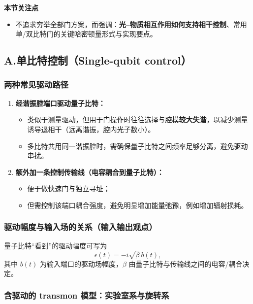 \documentclass[12pt,a4paper,oneside]{ctexbook}
\begin{document}
\noindent\textbf{本节关注点}

\begin{itemize}
  \item 不追求穷举全部门方案，而强调：\textbf{光--物质相互作用如何支持相干控制}、常用单/双比特门的关键哈密顿量形式与实现要点。
\end{itemize}

\subsection{A.\quad 单比特控制（Single-qubit control）}

\subsubsection{两种常见驱动路径}

\begin{enumerate}
  \item \textbf{经谐振腔端口驱动量子比特：}
  \begin{itemize}
    \item 类似于测量驱动，但用于门操作时往往选择与腔模\textbf{较大失谐}，以减少测量诱导退相干（远离谐振，腔内光子数小）。
    \item 多比特共用同一谐振腔时，需确保量子比特之间频率足够分离，避免驱动串扰。
  \end{itemize}

  \item \textbf{额外加一条控制传输线（电容耦合到量子比特）：}
  \begin{itemize}
    \item 便于做快速门与独立寻址；
    \item 但需控制该端口耦合强度，避免明显增加能量弛豫，例如增加辐射损耗。
  \end{itemize}
\end{enumerate}

\subsubsection{驱动幅度与输入场的关系（输入输出观点）}

量子比特“看到”的驱动幅度可写为
\[
  \epsilon(t) = -i\sqrt{\beta}\, b(t),
\]
其中 $b(t)$ 为输入端口的驱动场幅度，$\beta$ 由量子比特与传输线之间的电容/耦合决定。

\subsubsection{含驱动的 transmon 模型：实验室系与旋转系}
\end{document}
